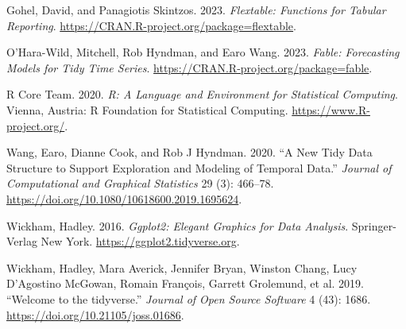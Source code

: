 \documentclass[
  letterpaper,
  DIV=11,
  numbers=noendperiod]{scrartcl}
\newlength{\cslhangindent}
\newlength{\cslentryspacingunit} %
\newenvironment{CSLReferences}[2] %
 {%
  \setlength{\parindent}{0pt}
  \ifodd #1
  \let\oldpar\par
  \def\par{\hangindent=\cslhangindent\oldpar}
  \fi
  \setlength{\parskip}{#2\cslentryspacingunit}
 }%
 {}
\begin{document}
\hypertarget{refs}{}
\begin{CSLReferences}{1}{0}
\leavevmode{}%
Gohel, David, and Panagiotis Skintzos. 2023. \emph{Flextable: Functions
for Tabular Reporting}.
\url{https://CRAN.R-project.org/package=flextable}.

\leavevmode{}%
O'Hara-Wild, Mitchell, Rob Hyndman, and Earo Wang. 2023. \emph{Fable:
Forecasting Models for Tidy Time Series}.
\url{https://CRAN.R-project.org/package=fable}.

\leavevmode{}%
R Core Team. 2020. \emph{R: A Language and Environment for Statistical
Computing}. Vienna, Austria: R Foundation for Statistical Computing.
\url{https://www.R-project.org/}.

\leavevmode{}%
Wang, Earo, Dianne Cook, and Rob J Hyndman. 2020. {``A New Tidy Data
Structure to Support Exploration and Modeling of Temporal Data.''}
\emph{Journal of Computational and Graphical Statistics} 29 (3):
466--78. \url{https://doi.org/10.1080/10618600.2019.1695624}.

\leavevmode{}%
Wickham, Hadley. 2016. \emph{Ggplot2: Elegant Graphics for Data
Analysis}. Springer-Verlag New York.
\url{https://ggplot2.tidyverse.org}.

\leavevmode{}%
Wickham, Hadley, Mara Averick, Jennifer Bryan, Winston Chang, Lucy
D'Agostino McGowan, Romain François, Garrett Grolemund, et al. 2019.
{``Welcome to the {tidyverse}.''} \emph{Journal of Open Source Software}
4 (43): 1686. \url{https://doi.org/10.21105/joss.01686}.

\end{CSLReferences}
\end{document}
